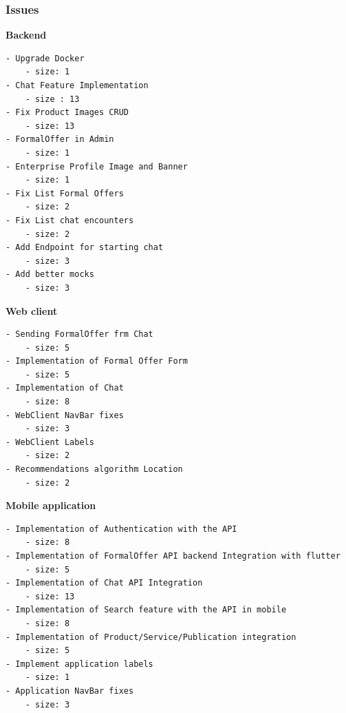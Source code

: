 \documentclass[./main.tex]{subfiles}
\begin{document}
\subsubsection{Issues}
\textbf{Backend}
\begin{verbatim}
- Upgrade Docker
	- size: 1
- Chat Feature Implementation
	- size : 13
- Fix Product Images CRUD
	- size: 13
- FormalOffer in Admin
	- size: 1
- Enterprise Profile Image and Banner
	- size: 1
- Fix List Formal Offers
	- size: 2
- Fix List chat encounters
	- size: 2
- Add Endpoint for starting chat
	- size: 3
- Add better mocks
	- size: 3
\end{verbatim}
\textbf{Web client}
\begin{verbatim}
- Sending FormalOffer frm Chat
    - size: 5
- Implementation of Formal Offer Form
    - size: 5
- Implementation of Chat
    - size: 8
- WebClient NavBar fixes
    - size: 3
- WebClient Labels
    - size: 2
- Recommendations algorithm Location
    - size: 2
\end{verbatim}
\textbf{Mobile application}
\begin{verbatim}
- Implementation of Authentication with the API
    - size: 8
- Implementation of FormalOffer API backend Integration with flutter
    - size: 5
- Implementation of Chat API Integration
    - size: 13
- Implementation of Search feature with the API in mobile
    - size: 8
- Implementation of Product/Service/Publication integration
    - size: 5
- Implement application labels
    - size: 1
- Application NavBar fixes
    - size: 3
\end{verbatim}
\end{document}
